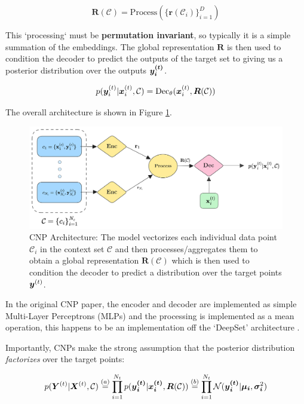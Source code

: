 \documentclass[../../main.tex]{subfiles}
\begin{document}
\begin{equation}
    \bm{R}(\mathcal{C}) = \text{Process}(\{ \bm{r}(\mathcal{C}_i) \}_{i=1}^D)
\end{equation}

This `processing` must be \textbf{permutation invariant}, so typically it is a simple summation of the embeddings. The global representation $\bm{R}$ is then used to condition the decoder to predict the outputs of the target set to giving us a posterior distribution over the outputs $\bm{y_i^{(t)}}$.

\begin{equation}
    p(\bm{y}_i^{(t)} | \bm{x}_i^{(t)}, \mathcal{C}) = \text{Dec}_\theta(\bm{x}_i^{(t)}, \bm{R}(\mathcal{C}))
\end{equation}

The overall architecture is shown in Figure \ref{fig:cnp-architecture}.

\begin{figure}[H]
	\centering
	\includegraphics[height=0.3\textwidth]{./cnp.png}
	\caption{CNP Architecture: The model vectorizes each individual data point $\mathcal{C}_i$ in the context set $\mathcal{C}$ and then processes/aggregates them to obtain a global representation $\bm{R}(\mathcal{C})$ which is then used to condition the decoder to predict a distribution over the target points $\bm{y}^{(t)}$.}
    \label{fig:cnp-architecture}
\end{figure}


In the original CNP paper, the encoder and decoder are implemented as simple Multi-Layer Perceptrons (MLPs) and the processing is implemented as a mean operation, this happens to be an implementation off the `DeepSet' architecture \cite{zaheer2018deep}.


Importantly, CNPs make the strong assumption that the posterior distribution \emph{factorizes} over the target points:

\begin{align}
    p(\bm{Y}^{(t)} | \bm{X}^{(t)}, \mathcal{C}) &\stackrel{(a)}{=} \prod_{i=1}^{N_t} p(\bm{{y}_i^{(t)}} | \bm{{x}_i^{(t)}}, \bm{R}(\mathcal{C}))  \stackrel{(b)}{=}
    \prod_{i=1}^{N_t} \mathcal{N}(\bm{{y}_i^{(t)}} | \bm{\mu_i}, \bm{\sigma_i}^2) \\
\end{align}
\end{document}
